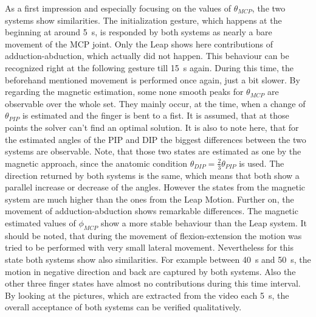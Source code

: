 As a first impression and especially focusing on the values of $ \theta_{MCP} $, the two systems show similarities. The initialization gesture, which happens at the beginning at around \SI{5}{\second}, is responded by both systems as nearly a bare movement of the \ac{MCP} joint. Only the Leap shows here contributions of adduction-abduction, which actually did not happen. This behaviour can be recognized right at the following gesture till \SI{15}{\second} again. During this time, the beforehand mentioned movement is performed once again, just a bit slower. By regarding the magnetic estimation, some none smooth peaks for $ \theta_{MCP} $ are observable over the whole set. They mainly occur, at the time, when a change of $ \theta_{PIP} $ is estimated and the finger is bent to a fist. It is assumed, that at those points the solver can't find an optimal solution. It is also to note here, that for the estimated angles of the \ac{PIP} and \ac{DIP} the biggest differences between the two systems are observable. Note, that those two states are estimated as one by the magnetic approach, since the anatomic condition $ \theta_{DIP} = \frac{2}{3} \theta_{PIP} $ is used. The direction returned by both systems is the same, which means that both show a parallel increase or decrease of the angles. However the states from the magnetic system are much higher than the ones from the Leap Motion. Further on, the movement of adduction-abduction shows remarkable differences. The magnetic estimated values of $ \phi_{MCP} $ show a more stable behaviour than the Leap system. It should be noted, that during the movement of flexion-extension the motion was tried to be performed with very small lateral movement. Nevertheless for this state both systems show also similarities. For example between \SI{40}{\second} and \SI{50}{\second}, the motion in negative direction and back are captured by both systems. Also the other three finger states have almost no contributions during this time interval. By looking at the pictures, which are extracted from the video each \SI{5}{\second}, the overall acceptance of both systems can be verified qualitatively.
\FloatBarrier


